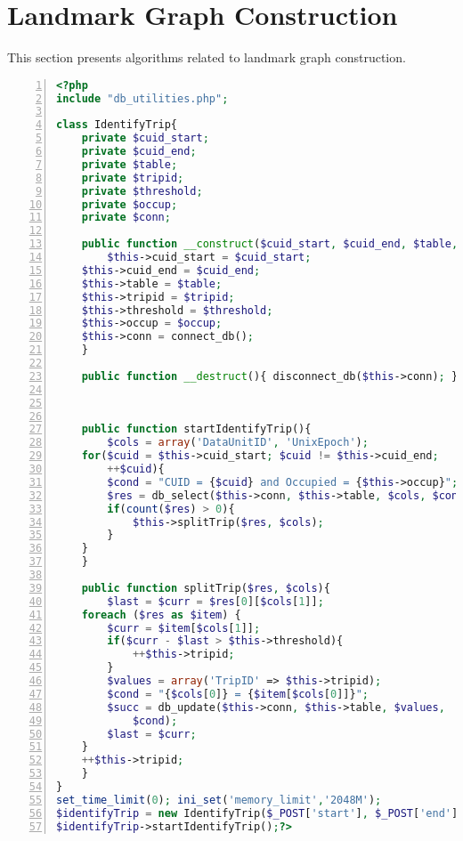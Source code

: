 \section{Landmark Graph Construction}
This section presents algorithms related to landmark graph construction. 
\begin{lstlisting}[language = PHP, caption = {Trip Identification}, label = {AList:trip_identification}, frame=single, numbers=left, stepnumber=1]
<?php
include "db_utilities.php";

class IdentifyTrip{
    private $cuid_start;
    private $cuid_end;
    private $table;
    private $tripid;
    private $threshold;
    private $occup;
    private $conn;
    
    public function __construct($cuid_start, $cuid_end, $table, $tripid, $threshold, $occup){
    	$this->cuid_start = $cuid_start;
	$this->cuid_end = $cuid_end;
	$this->table = $table;
	$this->tripid = $tripid;
	$this->threshold = $threshold;
	$this->occup = $occup;
	$this->conn = connect_db();
    }
    
    public function __destruct(){ disconnect_db($this->conn); }



    public function startIdentifyTrip(){
    	$cols = array('DataUnitID', 'UnixEpoch');
	for($cuid = $this->cuid_start; $cuid != $this->cuid_end; 
		++$cuid){
	    $cond = "CUID = {$cuid} and Occupied = {$this->occup}";
	    $res = db_select($this->conn, $this->table, $cols, $cond);
	    if(count($res) > 0){
	        $this->splitTrip($res, $cols);
	    }
	}
    }
    
    public function splitTrip($res, $cols){
    	$last = $curr = $res[0][$cols[1]];
	foreach ($res as $item) {
	    $curr = $item[$cols[1]];
	    if($curr - $last > $this->threshold){
	    	++$this->tripid;
	    }
	    $values = array('TripID' => $this->tripid);
	    $cond = "{$cols[0]} = {$item[$cols[0]]}";
	    $succ = db_update($this->conn, $this->table, $values, 
	    	$cond);
	    $last = $curr;
	}
	++$this->tripid;
    }
}
set_time_limit(0); ini_set('memory_limit','2048M');
$identifyTrip = new IdentifyTrip($_POST['start'], $_POST['end'], $_POST['table'], $_POST['tripid'], $_POST['threshold'], $_POST['occup']);
$identifyTrip->startIdentifyTrip();?>
\end{lstlisting}